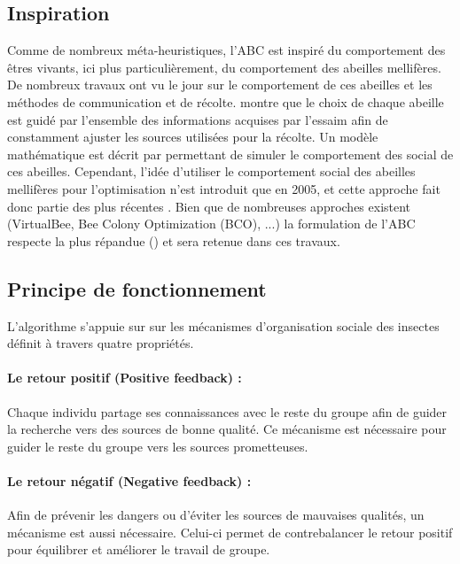 \subsection{Inspiration} %
\label{sub:inspiration}
Comme de nombreux méta-heuristiques, l’ABC est inspiré du comportement des êtres
vivants, ici plus particulièrement, du comportement des abeilles mellifères. De nombreux
travaux ont vu le jour sur le comportement de ces abeilles et les méthodes de
communication et de récolte. \cite{Visscher19821790} montre que le choix de chaque abeille
est guidé par l’ensemble des informations acquises par l’essaim afin de constamment
ajuster les sources utilisées pour la récolte.
Un modèle mathématique est décrit par \cite{Camazine1991547} permettant de simuler
le comportement des social de ces abeilles.
Cependant, l’idée d’utiliser le comportement social des abeilles mellifères pour l’optimisation
n’est introduit que en 2005, et cette approche fait donc partie des plus récentes \parencite{Karaboga2005}.
Bien que de nombreuses approches existent (VirtualBee, Bee Colony Optimization (BCO), ...)
la formulation de l’ABC respecte la plus répandue (\parencite{Karaboga201221}) et
sera retenue dans ces travaux.



\subsection{Principe de fonctionnement} %
\label{sub:principe_de_fonctionnement}
L’algorithme s’appuie sur sur les mécanismes d’organisation sociale des insectes \parencite{Bonabeau1999}
définit à travers quatre propriétés.

\paragraph{Le retour positif (Positive feedback) :} %
\label{par:positive_feedback}
Chaque individu partage ses connaissances avec le reste du groupe afin de guider
la recherche vers des sources de bonne qualité. Ce mécanisme est nécessaire pour
guider le reste du groupe vers les sources prometteuses.

\paragraph{Le retour négatif (Negative feedback) :} %
\label{par:negative_feedback}
Afin de prévenir les dangers ou d’éviter les sources de mauvaises qualités, un mécanisme est
aussi nécessaire. Celui-ci permet de contrebalancer le retour positif pour équilibrer
et améliorer le travail de groupe.

